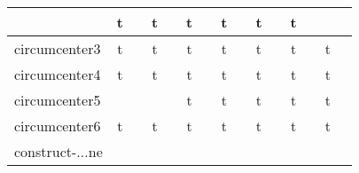 {\begin{longtable}{|l|*{7}{cr|}}
& \cellcolor{green!50}t & \cellcolor{green!50}{ 32} 
& \cellcolor{green!50}t & \cellcolor{green!50}{ 40} 
& \cellcolor{green!30}t & \cellcolor{green!30}{\sl 243} 
& \cellcolor{green!40}t & \cellcolor{green!40}{ 117} 
& \cellcolor{green!40}t & \cellcolor{green!40}{ 99} 
& \cellcolor{green!60}t & \cellcolor{green!60}{ 9} 
\\ \hline
\cellcolor{blue!10}circumcenter3 
& \cellcolor{green!60}t & \cellcolor{green!60}{\bf 7} 
& \cellcolor{green!50}t & \cellcolor{green!50}{ 29} 
& \cellcolor{green!50}t & \cellcolor{green!50}{ 36} 
& \cellcolor{green!30}t & \cellcolor{green!30}{\sl 242} 
& \cellcolor{green!40}t & \cellcolor{green!40}{ 129} 
& \cellcolor{green!40}t & \cellcolor{green!40}{ 89} 
& \cellcolor{green!60}t & \cellcolor{green!60}{ 4} 
\\ \hline
\cellcolor{blue!10}circumcenter4 
& \cellcolor{green!60}t & \cellcolor{green!60}{\bf 3} 
& \cellcolor{green!50}t & \cellcolor{green!50}{ 26} 
& \cellcolor{green!50}t & \cellcolor{green!50}{ 41} 
& \cellcolor{green!30}t & \cellcolor{green!30}{\sl 258} 
& \cellcolor{green!40}t & \cellcolor{green!40}{ 140} 
& \cellcolor{green!40}t & \cellcolor{green!40}{ 91} 
& \cellcolor{green!60}t & \cellcolor{green!60}{ 8} 
\\ \hline
\cellcolor{blue!10}circumcenter5 
& \cellcolor{yellow!25} & \cellcolor{yellow!25}{ 5} 
& \cellcolor{yellow!25} & \cellcolor{yellow!25}{ 4} 
& \cellcolor{green!50}t & \cellcolor{green!50}{\bf 41} 
& \cellcolor{green!30}t & \cellcolor{green!30}{\sl 243} 
& \cellcolor{green!40}t & \cellcolor{green!40}{ 106} 
& \cellcolor{green!40}t & \cellcolor{green!40}{ 96} 
& \cellcolor{green!30}t & \cellcolor{green!30}{ 247} 
\\ \hline
\cellcolor{blue!10}circumcenter6 
& \cellcolor{green!60}t & \cellcolor{green!60}{\bf 12} 
& \cellcolor{green!40}t & \cellcolor{green!40}{ 59} 
& \cellcolor{green!40}t & \cellcolor{green!40}{ 101} 
& \cellcolor{green!30}t & \cellcolor{green!30}{\sl 256} 
& \cellcolor{green!40}t & \cellcolor{green!40}{ 127} 
& \cellcolor{green!40}t & \cellcolor{green!40}{ 104} 
& \cellcolor{green!60}t & \cellcolor{green!60}{ 15} 
\\ \hline
\cellcolor{blue!10}construct-$\ldots$ne 
& \cellcolor{yellow!25} & \cellcolor{yellow!25}{ 4} 
& \cellcolor{yellow!25} & \cellcolor{yellow!25}{ 8} 
& \cellcolor{yellow!25} & \cellcolor{yellow!25}{ 23} 
& \cellcolor{yellow!25} & \cellcolor{yellow!25}{ 246} 
& \cellcolor{yellow!25} & \cellcolor{yellow!25}{ 88} 
& \cellcolor{yellow!25} & \cellcolor{yellow!25}{ 93} 
& \cellcolor{yellow!25} & \cellcolor{yellow!25}{ 346} 

\end{longtable}}
